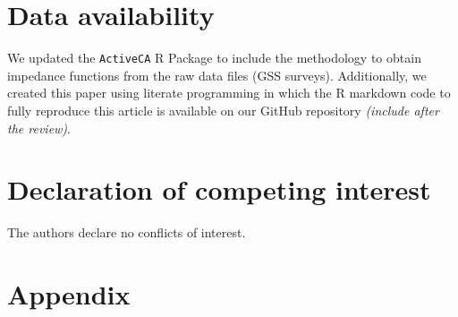 \documentclass[preprint, 3p,
authoryear]{elsarticle} %
\begin{document}
\section*{Data availability}\label{data-availability}

We updated the \texttt{ActiveCA} R Package to include the methodology to
obtain impedance functions from the raw data files (GSS surveys).
Additionally, we created this paper using literate programming in which
the R markdown code to fully reproduce this article is available on our
GitHub repository \emph{(include after the review)}.

\section*{Declaration of competing
interest}\label{declaration-of-competing-interest}

The authors declare no conflicts of interest.

\section*{Appendix}\label{appendix}

\renewcommand{\thetable}{A.1}

\begingroup\fontsize{8}{10}\selectfont
\end{document}
